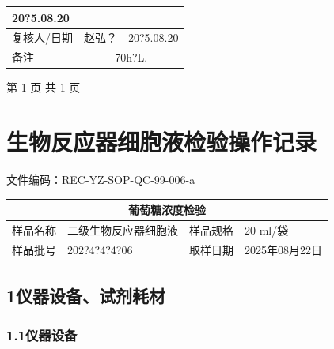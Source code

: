 \documentclass[UTF8,10pt,a4paper,fontset=fandol]{ctexart}
\newcommand{\fieldvalue}[1]{#1}
\newcommand{\handwritten}[1]{#1}
\begin{document}
\begin{center}
{\begin{tabular}{|p{2.0cm}|p{4.9cm}|p{2.0cm}|p{4.2cm}|}
{\fieldvalue{\handwritten{20?5.08.20}}}\\
\hline
复核人/日期 &
\multicolumn{1}{c|}{
\fieldvalue{\handwritten{赵弘？}}} &
\multicolumn{2}{l|}{
\fieldvalue{\handwritten{20?5.08.20}}}\\
\hline
备注 &
\multicolumn{3}{c|}{
\fieldvalue{\handwritten{70h\quad 13?L.}}}\\
\hline
\end{tabular}
}
\end{center}

\begin{center}
{\small 第 1 页 共 1 页}
\end{center}

\newpage

\section*{生物反应器细胞液检验操作记录}

\noindent
文件编码：REC-YZ-SOP-QC-99-006-a

\begin{tabular}{|p{2.2cm}|p{5.0cm}|p{2.2cm}|p{4.0cm}|}
\hline
\multicolumn{4}{|c|}{葡萄糖浓度检验} \\ \hline
样品名称 &
\fieldvalue{二级生物反应器细胞液} &
样品规格 &
\fieldvalue{\handwritten{20}} ml/袋 \\ \hline
样品批号 &
\fieldvalue{\handwritten{202?4?4?4?06}} &
取样日期 &
\fieldvalue{\handwritten{2025年08月22日}} \\ \hline
\end{tabular}

\subsection*{1\quad 仪器设备、试剂耗材}

\subsubsection*{1.1\quad 仪器设备}
\end{document}
